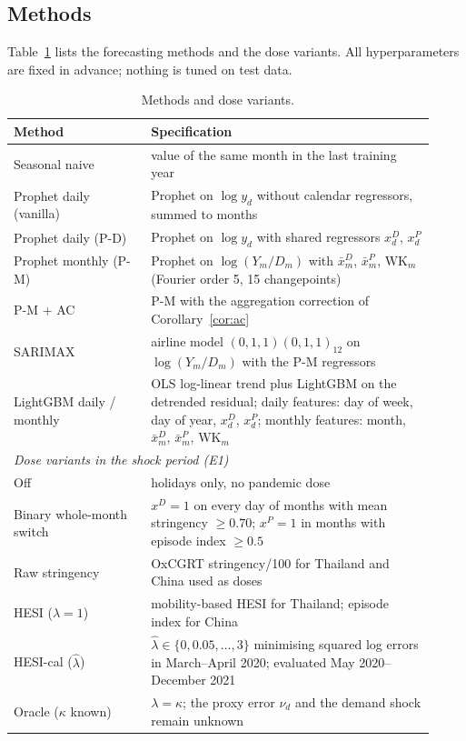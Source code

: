 \documentclass{article}
\theoremstyle{plain}
\theoremstyle{definition}
\theoremstyle{remark}
\begin{document}
\subsection{Methods}
Table~\ref{tab:models} lists the forecasting methods and the dose variants. All hyperparameters are fixed in advance; nothing is tuned on test data.

\begin{table}[t]
\centering\small
\caption{Methods and dose variants.}
\label{tab:models}
\begin{tabular}{p{0.30\linewidth}p{0.62\linewidth}}
\toprule
Method & Specification \\
\midrule
Seasonal naive & value of the same month in the last training year \\
Prophet daily (vanilla) & Prophet on $\log y_d$ without calendar regressors, summed to months \\
Prophet daily (P-D) & Prophet on $\log y_d$ with shared regressors $x^D_d$, $x^P_d$ \\
Prophet monthly (P-M) & Prophet on $\log(Y_m/D_m)$ with $\bar x^D_m$, $\bar x^P_m$, $\mathrm{WK}_m$ (Fourier order 5, 15 changepoints) \\
P-M + AC & P-M with the aggregation correction of Corollary~\ref{cor:ac} \\
SARIMAX & airline model $(0,1,1)(0,1,1)_{12}$ on $\log(Y_m/D_m)$ with the P-M regressors \citep{box2015time} \\
LightGBM daily / monthly & OLS log-linear trend plus LightGBM on the detrended residual; daily features: day of week, day of year, $x^D_d$, $x^P_d$; monthly features: month, $\bar x^D_m$, $\bar x^P_m$, $\mathrm{WK}_m$ \\
\midrule
\multicolumn{2}{l}{\textit{Dose variants in the shock period (E1)}} \\
Off & holidays only, no pandemic dose \\
Binary whole-month switch & $x^D=1$ on every day of months with mean stringency $\ge0.70$; $x^P=1$ in months with episode index $\ge0.5$ \\
Raw stringency & OxCGRT stringency/100 for Thailand and China used as doses \\
HESI ($\lambda=1$) & mobility-based HESI for Thailand; episode index for China \\
HESI-cal ($\hat\lambda$) & $\hat\lambda\in\{0,0.05,\dots,3\}$ minimising squared log errors in March--April 2020; evaluated May 2020--December 2021 \\
Oracle ($\kappa$ known) & $\lambda=\kappa$; the proxy error $\nu_d$ and the demand shock remain unknown \\

\end{tabular}
\end{table}
\end{document}
